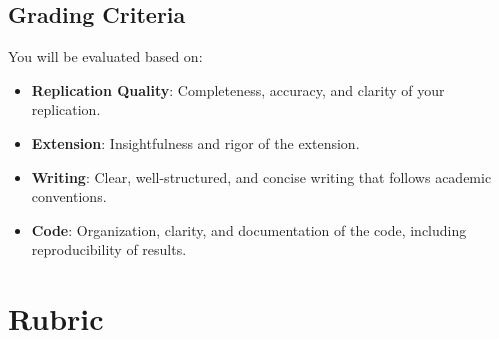 \documentclass[
]{article}
\providecommand{\tightlist}{%
  \setlength{\itemsep}{0pt}\setlength{\parskip}{0pt}}
\begin{document}
\hypertarget{grading-criteria}{%
\subsection{Grading Criteria}\label{grading-criteria}}

You will be evaluated based on:

\begin{itemize}
\tightlist
\item
  \textbf{Replication Quality}: Completeness, accuracy, and clarity of your replication.
\item
  \textbf{Extension}: Insightfulness and rigor of the extension.
\item
  \textbf{Writing}: Clear, well-structured, and concise writing that follows academic conventions.
\item
  \textbf{Code}: Organization, clarity, and documentation of the code, including reproducibility of results.
\end{itemize}

\newpage

\hypertarget{rubric}{%
\section{Rubric}\label{rubric}}
\end{document}
